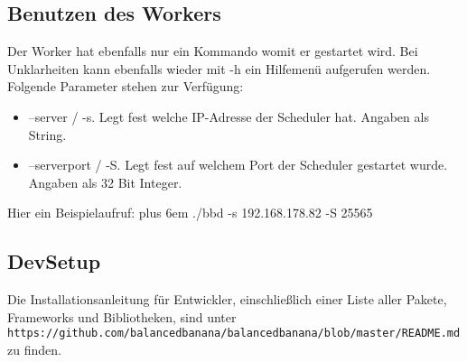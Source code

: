 \documentclass[a4paper,12pt]{article}
\makeatletter
\newenvironment{mycode}
 {\def\@xobeysp{\ }\verbatim\rightskip=0pt plus 6em\relax}
 {\endverbatim}
\makeatother
\begin{document}
\subsection{Benutzen des Workers}
Der Worker hat ebenfalls nur ein Kommando womit er gestartet wird. Bei Unklarheiten kann ebenfalls wieder mit -h ein Hilfemenü aufgerufen werden. Folgende Parameter stehen zur Verfügung:
\begin{itemize}
	\item --server / -s. Legt fest welche IP-Adresse der Scheduler hat. Angaben als String.
	\item --serverport / -S. Legt fest auf welchem Port der Scheduler gestartet wurde. Angaben als 32 Bit Integer.
\end{itemize}
Hier ein Beispielaufruf:
\begin{mycode}
	./bbd -s 192.168.178.82 -S 25565
\end{mycode}

\subsection{DevSetup}
Die Installationsanleitung für Entwickler, einschließlich einer Liste aller Pakete, Frameworks und Bibliotheken, sind unter \\
\texttt{https://github.com/balancedbanana/balancedbanana/blob/master/README.md} zu finden.
\end{document}
